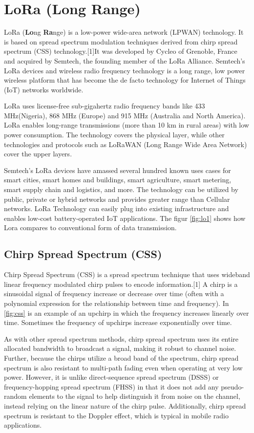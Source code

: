 \section{LoRa (Long Range)}
LoRa (\textbf{Lo}ng \textbf{Ra}nge) is a low-power wide-area network (LPWAN) technology. It is based on spread spectrum modulation techniques derived from chirp spread spectrum (CSS) technology.[1]It was developed by Cycleo of Grenoble, France and acquired by Semtech, the founding member of the LoRa Alliance.
Semtech’s LoRa devices and wireless radio frequency technology is a long range, low power wireless platform that has become the de facto technology for Internet of Things (IoT) networks worldwide.

LoRa uses license-free sub-gigahertz radio frequency bands like 433 MHz(Nigeria), 868 MHz (Europe) and 915 MHz (Australia and North America). LoRa enables long-range transmissions (more than 10 km in rural areas) with low power consumption. The technology covers the physical layer, while other technologies and protocols such as LoRaWAN (Long Range Wide Area Network) cover the upper layers. 

Semtech’s LoRa devices have amassed several hundred known uses cases for smart cities, smart homes and buildings, smart agriculture, smart metering, smart supply chain and logistics, and more. The technology can be utilized by public, private or hybrid networks and provides greater range than Cellular networks. LoRa Technology can easily plug into existing infrastructure and enables low-cost battery-operated IoT applications. The figur \ref{fig:lo1} shows how Lora compares to conventional form of data transmission. 

\subsection{Chirp Spread Spectrum (CSS)}
Chirp Spread Spectrum (CSS) is a spread spectrum technique that uses wideband linear frequency modulated chirp pulses to encode information.[1] A chirp is a sinusoidal signal of frequency increase or decrease over time (often with a polynomial expression for the relationship between time and frequency). In \ref{fig:css} is an example of an upchirp in which the frequency increases linearly over time. Sometimes the frequency of upchirps increase exponentially over time. 

As with other spread spectrum methods, chirp spread spectrum uses its entire allocated bandwidth to broadcast a signal, making it robust to channel noise. Further, because the chirps utilize a broad band of the spectrum, chirp spread spectrum is also resistant to multi-path fading even when operating at very low power. However, it is unlike direct-sequence spread spectrum (DSSS) or frequency-hopping spread spectrum (FHSS) in that it does not add any pseudo-random elements to the signal to help distinguish it from noise on the channel, instead relying on the linear nature of the chirp pulse. Additionally, chirp spread spectrum is resistant to the Doppler effect, which is typical in mobile radio applications.


